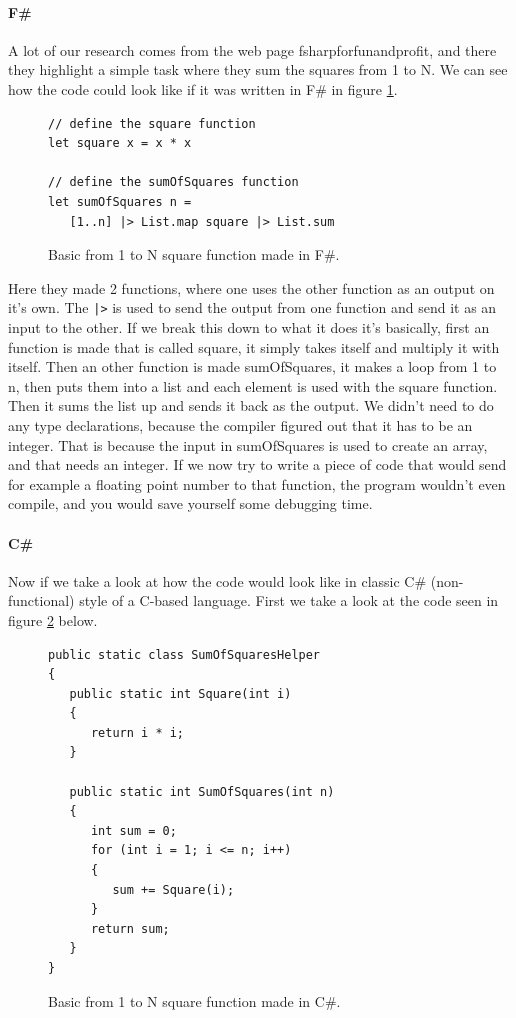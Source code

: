 \documentclass[12pt, a4paper]{article}
\newcommand{\code}[1]{{\small \texttt{#1}}}
\begin{document}
\paragraph{F\#}
A lot of our research comes from the web page fsharpforfunandprofit, and there they highlight a simple task where they sum the squares from 1 to N. We can see how the code could look like if it was written in F\# in figure \ref{fig:SquareFunctionFSharp}.

\begin{figure}[!h]
\begin{lstlisting}
// define the square function
let square x = x * x

// define the sumOfSquares function
let sumOfSquares n = 
   [1..n] |> List.map square |> List.sum
\end{lstlisting}
\caption{Basic from 1 to N square function made in F\#.}
\label{fig:SquareFunctionFSharp}
\end{figure}

Here they made 2 functions, where one uses the other function as an output on it’s own. The \code{|>} is used to send the output from one function and send it as an input to the other.
If we break this down to what it does it’s basically, first an function is made that is called square, it simply takes itself and multiply it with itself. Then an other function is made sumOfSquares, it makes a loop from 1 to n, then puts them into a list and each element is used with the square function. Then it sums the list up and sends it back as the output. We didn’t need to do any type declarations, because the compiler figured out that it has to be an integer. That is because the input in sumOfSquares is used to create an array, and that needs an integer. If we now try to write a piece of code that would send for example a floating point number to that function, the program wouldn’t even compile, and you would save yourself some debugging time.\\

\newpage

\paragraph{C\#}
Now if we take a look at how the code would look like in classic C\# (non-functional) style of a C-based language. First we take a look at the code seen in figure \ref{fig:SquareFunctionCSharp} below.

\begin{figure}[!h]
\begin{lstlisting}
public static class SumOfSquaresHelper
{
   public static int Square(int i)
   {
      return i * i;
   }

   public static int SumOfSquares(int n)
   {
      int sum = 0;
      for (int i = 1; i <= n; i++)
      {
         sum += Square(i);
      }
      return sum;
   }
}
\end{lstlisting}
\caption{Basic from 1 to N square function made in C\#.}
\label{fig:SquareFunctionCSharp}
\end{figure}
\end{document}
